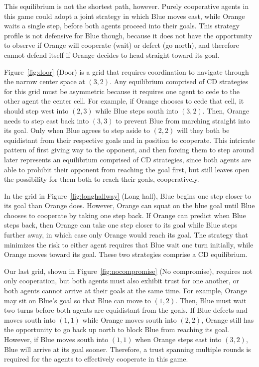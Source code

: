 This equilibrium is not the shortest path, however.
%
Purely cooperative agents in this game could adopt a joint strategy in
which Blue moves east, while Orange waits a single step, before both
agents proceed into their goals.  This strategy profile is not
defensive for Blue though, because it does not have the opportunity to
observe if Orange will cooperate (wait) or defect (go north), and
therefore cannot defend itself if Orange decides to head straight
toward its goal.


Figure~\ref{fig:door} (Door) is a grid that requires coordination to
navigate through the narrow center space at $(3,2)$. Any
equilibrium comprised of CD strategies for this grid must be asymmetric
because it requires one agent to cede to the other agent the center
cell. For example, if Orange chooses to cede that cell, it should step
west into $(2,3)$ while Blue steps south into $(3,2)$. Then, Orange
needs to step east back into $(3,3)$ to prevent Blue from marching
straight into its goal. Only when Blue agrees to step aside to $(2,2)$
will they both be equidistant from their respective goals and in
position to cooperate.
%
This intricate pattern of first giving way to the opponent, and then
forcing them to step around later represents an equilibrium comprised
of CD strategies, since both agents are able to prohibit their
opponent from reaching the goal first, but still leaves open the
possibility for them both to reach their goals, cooperatively.

In the grid in Figure~\ref{fig:longhallway} (Long hall), Blue begins
one step closer to its goal than Orange does.  However, Orange can
squat on the blue goal until Blue chooses to cooperate by taking one
step back. If Orange can predict when Blue steps back, then Orange can
take one step closer to its goal while Blue steps further away, in
which case only Orange would reach its goal.  The strategy that
minimizes the risk to either agent requires that Blue wait one turn
initially, while Orange moves toward its goal.  These two strategies
comprise a CD equilibrium.

Our last grid, shown in Figure~\ref{fig:nocompromise} (No compromise),
requires not only cooperation, but both agents must also exhibit trust
for one another, or both agents cannot arrive at their goals at the
same time.  For example, Orange may sit on Blue's goal so that Blue
can move to $(1,2)$.  Then, Blue must wait two turns before both
agents are equidistant from the goals.  If Blue defects and moves
south into $(1,1)$ while Orange moves south into $(2,2)$, Orange still
has the opportunity to go back up north to block Blue from reaching
its goal.  However, if Blue moves south into $(1,1)$ when Orange steps
east into $(3,2)$, Blue will arrive at its goal sooner.  Therefore, a
trust spanning multiple rounds is required for the agents to
effectively cooperate in this game.

